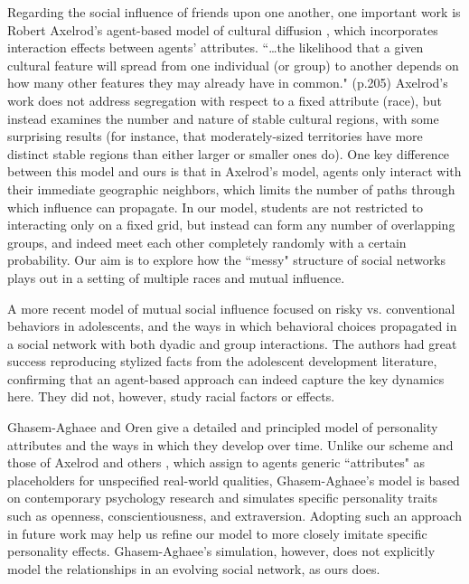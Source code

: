 Regarding the social influence of friends upon one another, one important work
is Robert Axelrod's agent-based model of cultural diffusion
\cite{axelrod_dissemination_1997}, which incorporates interaction effects
between agents' attributes. ``\dots the likelihood that a given cultural
feature will spread from one individual (or group) to another depends on how
many other features they may already have in common." (p.205) Axelrod's work
does not address segregation with respect to a fixed attribute (race), but
instead examines the number and nature of stable cultural regions, with some
surprising results (for instance, that moderately-sized territories have more
distinct stable regions than either larger or smaller ones do). One key
difference between this model and ours is that in Axelrod's model, agents only
interact with their immediate geographic neighbors, which limits the number of
paths through which influence can propagate. In our model, students are not
restricted to interacting only on a fixed grid, but instead can form any
number of overlapping groups, and indeed meet each other completely randomly
with a certain probability. Our aim is to explore how the ``messy" structure
of social networks plays out in a setting of multiple races and mutual
influence.

A more recent model of mutual social influence \cite{schuhmacher_using_2014}
focused on risky vs. conventional behaviors in adolescents, and the ways in
which behavioral choices propagated in a social network with both dyadic and
group interactions. The authors had great success reproducing stylized facts
from the adolescent development literature, confirming that an agent-based
approach can indeed capture the key dynamics here. They did not, however,
study racial factors or effects.

Ghasem-Aghaee and Oren \citeyear{ghasem-aghaee_cognitive_2007} give a detailed
and principled model of personality attributes and the ways in which they
develop over time. Unlike our scheme and those of Axelrod and others
\cite{epstein_growing_1996}, which assign to agents generic ``attributes" as
placeholders for unspecified real-world qualities, Ghasem-Aghaee's model is
based on contemporary psychology research and simulates specific personality
traits such as openness, conscientiousness, and extraversion. Adopting such an
approach in future work may help us refine our model to more closely imitate
specific personality effects. Ghasem-Aghaee's simulation, however, does not
explicitly model the relationships in an evolving social network, as ours
does.


